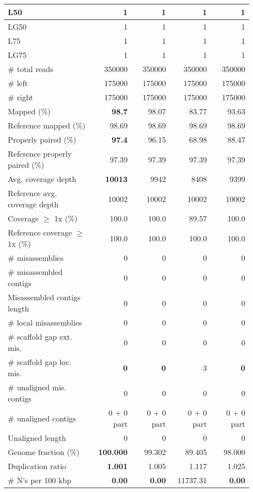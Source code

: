 \documentclass[12pt,a4paper]{article}
\begin{document}
\begin{table}[ht]
\begin{center}
\begin{tabular}{|l*{4}{|r}|}
L50 & 1 & 1 & 1 & 1 \\ \hline
LG50 & 1 & 1 & 1 & 1 \\ \hline
L75 & 1 & 1 & 1 & 1 \\ \hline
LG75 & 1 & 1 & 1 & 1 \\ \hline
\# total reads & 350000 & 350000 & 350000 & 350000 \\ \hline
\# left & 175000 & 175000 & 175000 & 175000 \\ \hline
\# right & 175000 & 175000 & 175000 & 175000 \\ \hline
Mapped (\%) & {\bf 98.7} & 98.07 & 83.77 & 93.63 \\ \hline
Reference mapped (\%) & 98.69 & 98.69 & 98.69 & 98.69 \\ \hline
Properly paired (\%) & {\bf 97.4} & 96.15 & 68.98 & 88.47 \\ \hline
Reference properly paired (\%) & 97.39 & 97.39 & 97.39 & 97.39 \\ \hline
Avg. coverage depth & {\bf 10013} & 9942 & 8408 & 9399 \\ \hline
Reference avg. coverage depth & 10002 & 10002 & 10002 & 10002 \\ \hline
Coverage $\geq$ 1x (\%) & 100.0 & 100.0 & 89.57 & 100.0 \\ \hline
Reference coverage $\geq$ 1x (\%) & 100.0 & 100.0 & 100.0 & 100.0 \\ \hline
\# misassemblies & 0 & 0 & 0 & 0 \\ \hline
\# misassembled contigs & 0 & 0 & 0 & 0 \\ \hline
Misassembled contigs length & 0 & 0 & 0 & 0 \\ \hline
\# local misassemblies & 0 & 0 & 0 & 0 \\ \hline
\# scaffold gap ext. mis. & 0 & 0 & 0 & 0 \\ \hline
\# scaffold gap loc. mis. & {\bf 0} & {\bf 0} & 3 & {\bf 0} \\ \hline
\# unaligned mis. contigs & 0 & 0 & 0 & 0 \\ \hline
\# unaligned contigs & 0 + 0 part & 0 + 0 part & 0 + 0 part & 0 + 0 part \\ \hline
Unaligned length & 0 & 0 & 0 & 0 \\ \hline
Genome fraction (\%) & {\bf 100.000} & 99.302 & 89.405 & 98.000 \\ \hline
Duplication ratio & {\bf 1.001} & 1.005 & 1.117 & 1.025 \\ \hline
\# N's per 100 kbp & {\bf 0.00} & {\bf 0.00} & 11737.31 & {\bf 0.00} \\ \hline

\end{tabular}
\end{center}
\end{table}
\end{document}
